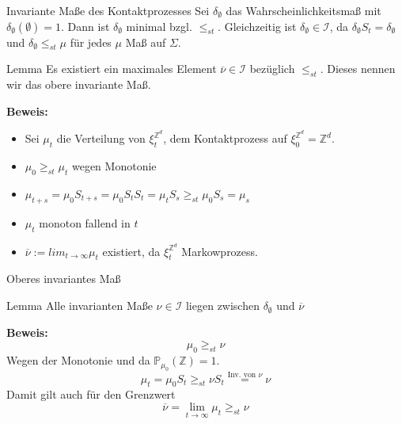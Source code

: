 \documentclass[11pt]{beamer}
\begin{document}
\begin{frame}{Invariante Maße des Kontaktprozesses}
    Sei $\delta_\emptyset$ das Wahrscheinlichkeitsmaß mit $\delta_\emptyset(\emptyset) = 1$.
    Dann ist $\delta_\emptyset$ minimal bzgl. $\leq_{st}$. Gleichzeitig ist
    $\delta_\emptyset \in \mathcal{I}$, da $\delta_\emptyset S_t = \delta_\emptyset $ und
    $\delta_\emptyset \leq_{st} \mu$ für jedes $\mu$ Maß auf $\Sigma$.
    
    \begin{block}{Lemma}
        Es existiert ein maximales Element $\overline{\nu} \in \mathcal{I}$ bezüglich
        $\leq_{st}$. Dieses nennen wir das obere invariante Maß.
    \end{block}
    
    \textbf{Beweis:}
    \\
    \begin{itemize}
        \item<3-> Sei $\mu_t$ die Verteilung von $\xi_t^{\mathbb{Z}^d}$, dem Kontaktprozess
        auf $\xi_0^{\mathbb{Z}^d} = \mathbb{Z}^d$.
        \item<4-> $\mu_0 \geq_{st} \mu_t$ wegen Monotonie 
        \item<5-> $\mu_{t + s} = \mu_0S_{t + s} = \mu_0S_t S_t = \mu_t S_s \geq_{st} \mu_0 S_s = \mu_s$
        \item<6-> $\mu_t$ monoton fallend in $t$
        \item<7-> $\overline{\nu} := lim_{t \to \infty} \mu_t$ existiert, da
        $\xi_t^{\mathbb{Z}^d}$ Markowprozess.
    \end{itemize}
\end{frame}

\begin{frame}{Oberes invariantes Maß}
    \begin{block}{Lemma}
        Alle invarianten Maße $\nu \in \mathcal{I}$ liegen zwischen $\delta_\emptyset$
        und $\overline{\nu}$
    \end{block}
    \textbf{Beweis:}
    \\
    \begin{equation*}
        \mu_0 \geq_{st} \nu 
    \end{equation*}
    Wegen der Monotonie und da $\mathbb{P}_{\mu_0}(\mathbb{Z}) = 1$.
    \begin{equation*}
        \mu_t = \mu_0 S_t \geq_{st} \nu S_t \overset{\text{Inv. von }\nu}{=} \nu
    \end{equation*}
    Damit gilt auch für den Grenzwert
    \begin{equation*}
        \overline{\nu} = \lim_{t \to \infty} \mu_t \geq_{st} \nu
    \end{equation*}
\end{frame}
\end{document}

